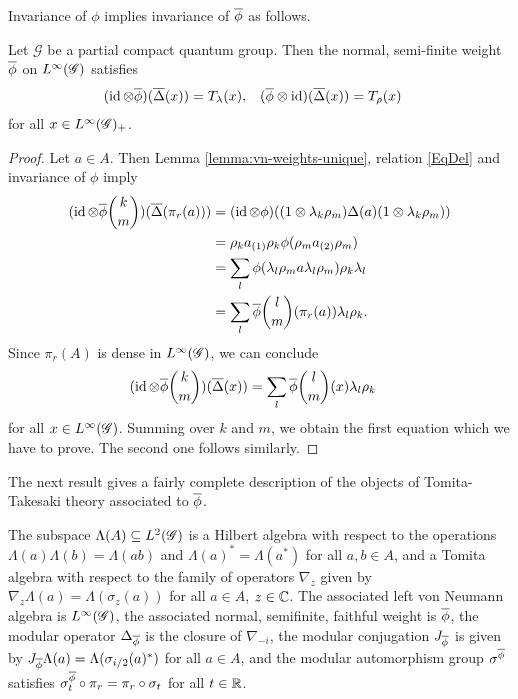 Invariance of $\phi$ implies invariance of $\overline{\phi}$ as follows.
\begin{Prop} \label{prop:vn-invariance}
  Let $\mathscr{G}$ be a partial compact quantum group. Then the
  normal, semi-finite weight $\overline{\phi}$ on $L^{\infty}(\mathscr{G})$ satisfies
  \begin{align*}
    (\operatorname{id} \otimes \overline{\phi})(\overline{\Delta}(x)) &=  T_{\lambda}(x), &
    (\overline{\phi} \otimes \operatorname{id})(\overline{\Delta}(x)) &= T_{\rho}(x)
  \end{align*}
for all $x\in L^{\infty}(\mathscr{G})_{+}$.
\end{Prop}
\begin{proof}
  Let  $a \in A$.  Then Lemma \ref{lemma:vn-weights-unique}, relation \eqref{EqDel}
  and invariance of $\phi$ imply
  \begin{align*}
    (\operatorname{id} \otimes \overline{\phi}{k\choose m})(\overline{\Delta}(\pi_{r}(a))) &= (\operatorname{id} \otimes
    \phi)((1 \otimes \lambda_{k}\rho_{m})\Delta(a)(1 \otimes
    \lambda_{k}\rho_{m})) \\ & =
    \rho_{k}a_{(1)}\rho_{k}\phi(\rho_{m}a_{(2)}\rho_{m}) \\ & = \sum_{l}
    \phi(\lambda_{l}\rho_{m}a\lambda_{l}\rho_{m})\rho_{k}\lambda_{l} \\
    & = \sum_{l} \overline{\phi}{l\choose m}(\pi_{r}(a)) \lambda_{l}\rho_{k}.
  \end{align*}
  Since $\pi_{r}(A)$ is dense in $L^{\infty}(\mathscr{G})$, we can conclude
  \begin{align*}
    (\operatorname{id} \otimes \overline{\phi}{k\choose m}) (\overline{\Delta} (x)) &= \sum_{l} \overline{\phi}{l\choose m}(x) \lambda_{l}\rho_{k}
  \end{align*}
  for all $x \in L^{\infty}(\mathscr{G})$. Summing over $k$ and $m$, we obtain the
  first  equation which we have to prove. The second one follows similarly.
\end{proof}
The next result gives a fairly complete description of the objects of
Tomita-Takesaki theory associated to $\overline{\phi}$.
\begin{Lem} \label{lemma:vn-hilbert} The subspace
  $\Lambda(A) \subseteq L^{2}(\mathscr{G})$ is a Hilbert algebra with respect to
  the operations $\Lambda(a)\Lambda(b)=\Lambda(ab)$ and
  $\Lambda(a)^{*}= \Lambda(a^{*})$ for all $a,b\in A$, and a Tomita
  algebra with respect to the family of operators $\nabla_{z}$ given
  by $\nabla_{z}\Lambda(a)=\Lambda(\sigma_{z}(a))$ for all $a\in A$,
  $z\in \mathbb{C}$.  The associated left von Neumann
  algebra is $L^{\infty}(\mathscr{G})$, the associated normal, semifinite, faithful
  weight is $\overline{\phi}$, the modular operator  $\Delta_{\overline{\phi}}$ is the
  closure of $\nabla_{-i}$,  the modular conjugation $J_{\overline{\phi}}$ is
  given by $J_{\overline{\phi}}\Lambda(a)=\Lambda(\sigma_{i/2}(a)^{*})$ for all
  $a\in A$, and the modular automorphism group $\sigma^{\overline{\phi}}$
  satisfies $\sigma^{\overline{\phi}}_{t} \circ \pi_{r} = \pi_{r} \circ
  \sigma_{t}$ for all $t\in \mathbb{R}$.
\end{Lem}
